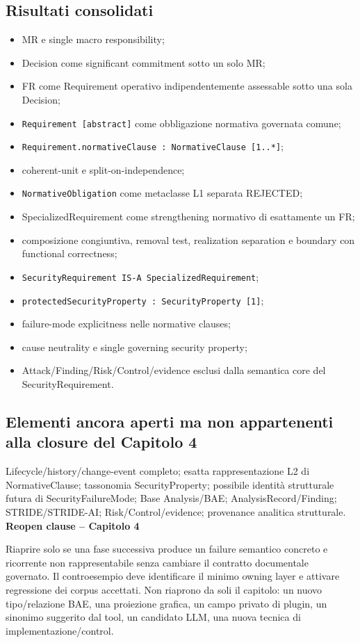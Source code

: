 \documentclass[11pt,a4paper]{article}
\newenvironment{reopenbox}[1]{\def\FrameCommand{\fcolorbox{ddtaorange}{ddtagray}}\MakeFramed{\advance\hsize-2\width\FrameRestore}\noindent\textbf{#1}\par\smallskip}{\endMakeFramed}
\begin{document}
\subsection{Risultati consolidati}
\begin{itemize}
\item MR e single macro responsibility;
\item Decision come significant commitment sotto un solo MR;
\item FR come Requirement operativo indipendentemente assessable sotto una sola Decision;
\item \texttt{Requirement [abstract]} come obbligazione normativa governata comune;
\item \texttt{Requirement.normativeClause : NormativeClause [1..*]};
\item coherent-unit e split-on-independence;
\item \texttt{NormativeObligation} come metaclasse L1 separata REJECTED;
\item SpecializedRequirement come strengthening normativo di esattamente un FR;
\item composizione congiuntiva, removal test, realization separation e boundary con functional correctness;
\item \texttt{SecurityRequirement IS-A SpecializedRequirement};
\item \texttt{protectedSecurityProperty : SecurityProperty [1]};
\item failure-mode explicitness nelle normative clauses;
\item cause neutrality e single governing security property;
\item Attack/Finding/Risk/Control/evidence esclusi dalla semantica core del SecurityRequirement.
\end{itemize}
\subsection{Elementi ancora aperti ma non appartenenti alla closure del Capitolo 4}
Lifecycle/history/change-event completo; esatta rappresentazione L2 di NormativeClause; tassonomia SecurityProperty; possibile identità strutturale futura di SecurityFailureMode; Base Analysis/BAE; AnalysisRecord/Finding; STRIDE/STRIDE-AI; Risk/Control/evidence; provenance analitica strutturale.
\begin{reopenbox}{Reopen clause -- Capitolo 4}
Riaprire solo se una fase successiva produce un failure semantico concreto e ricorrente non rappresentabile senza cambiare il contratto documentale governato. Il controesempio deve identificare il minimo owning layer e attivare regressione dei corpus accettati.
\end{reopenbox}
Non riaprono da soli il capitolo: un nuovo tipo/relazione BAE, una proiezione grafica, un campo privato di plugin, un sinonimo suggerito dal tool, un candidato LLM, una nuova tecnica di implementazione/control.
\end{document}
